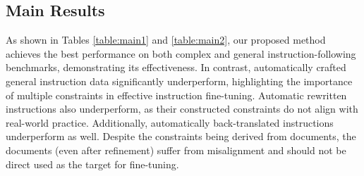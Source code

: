 \begin{table}[!ht]
\centering
\renewcommand{\arraystretch}{0.95}
\vspace{-3mm}
\caption{Experiment results on Llama-3-8B, fine-tuned with tulu-330k \cite{lambert2024tulu3}, with Llama-3-70B-Instruct as the guidance model.}
\vspace{-3mm}
\label{table:main2}
\end{table}

\subsection{Main Results}
As shown in Tables \ref{table:main1} and \ref{table:main2}, our proposed method achieves the best performance on both complex and general instruction-following benchmarks, demonstrating its effectiveness. In contrast, automatically crafted general instruction data significantly underperform, highlighting the importance of multiple constraints in effective instruction fine-tuning. Automatic rewritten instructions also underperform, as their constructed constraints do not align with real-world practice. Additionally, automatically back-translated instructions underperform as well. Despite the constraints being derived from documents, the documents (even after refinement) suffer from misalignment and should not be direct used as the target for fine-tuning.

